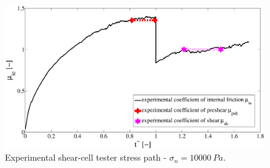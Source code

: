 \begin{figure}[!htb] 
\centering 
\includegraphics[width=.96\textwidth]{images/020experimental} 
\caption[Experimental shear cell tester stress path]{Experimental shear-cell tester stress path - $\sigma_n = 10000
        ~Pa$.}
\label{fig:020experimental} 
\end{figure}

